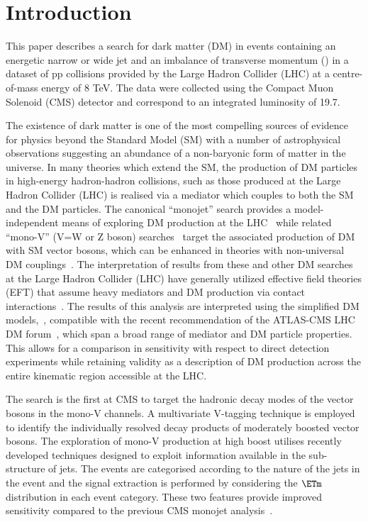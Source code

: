 \section{Introduction}
This paper describes a search for dark matter (DM) in events containing an energetic narrow or wide jet and an imbalance of transverse momentum (\ETm) in a dataset 
of pp collisions provided by the Large Hadron Collider (LHC) at a centre-of-mass energy of 8 TeV. The data were collected using the Compact Muon Solenoid (CMS) 
detector and correspond to an integrated luminosity of 19.7\fbinv. 

The existence of dark matter is one of the most compelling sources of evidence for physics beyond the Standard Model (SM) with a number of astrophysical observations 
suggesting an abundance of a non-baryonic form of matter in the universe. In many theories which extend the SM, the production of DM particles in high-energy hadron-hadron 
collisions, such as those produced at the Large Hadron Collider (LHC) is realised via a mediator which couples to both the SM and the DM particles.  
The canonical ``monojet'' search provides a model-independent means of exploring DM production at the LHC~\cite{monojet1,monojet2} while 
related ``mono-V'' (V=W or Z boson) searches~\cite{monolep,monoZHbb,Aad:2014vka,Aad:2013oja,ATLAS:2014wra} target the associated production of DM with SM vector bosons, 
which can be enhanced in theories with non-universal DM couplings~\cite{IVDM}.  The interpretation of results from these and other DM searches at 
the Large Hadron Collider (LHC) have generally utilized effective field theories (EFT) that assume heavy mediators and DM production via contact interactions~\cite{Fox:2011pm}.  
The results of this analysis are interpreted using the simplified DM models,~\cite{simplified1,Buchmueller:2013dya,Buchmueller:2014yoa}, compatible with the recent recommendation of the ATLAS-CMS LHC DM forum~\cite{Abercrombie:2015wmb}, which span a broad range of 
mediator and DM particle properties. This allows for a comparison in sensitivity with respect to direct detection experiments while retaining validity as a description of DM 
production across the entire kinematic region accessible at the LHC. 

The search is the first at CMS to target the hadronic decay modes of the vector bosons in the mono-V channels. A multivariate V-tagging technique is 
employed to identify the individually resolved decay products of moderately boosted vector bosons. The exploration of mono-V production at high boost 
utilises recently developed techniques designed to exploit information 
available in the sub-structure of jets. The events are categorised according to the nature of the jets in the event and the signal extraction is performed by 
considering the $\ETm$ distribution in each event category. These two features provide improved sensitivity compared to the previous CMS monojet analysis~\cite{monojet1}. 



